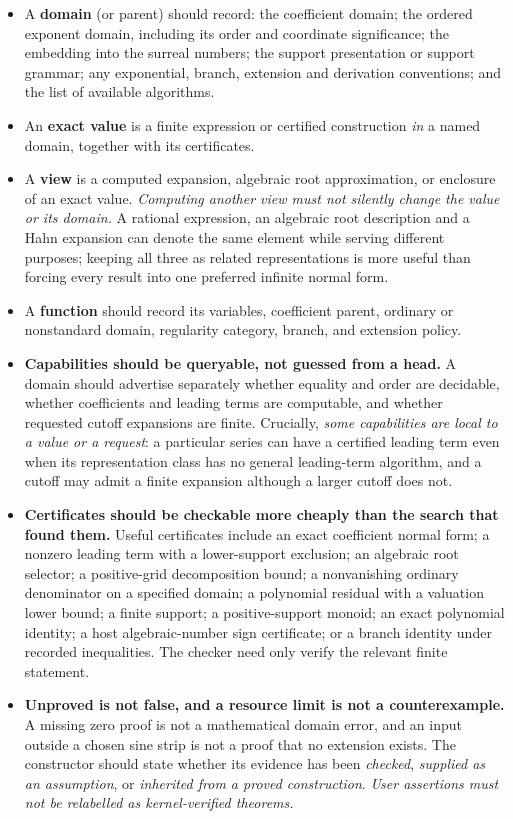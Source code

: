 \documentclass[11pt,letterpaper]{article}
\numberwithin{equation}{section}
\theoremstyle{definition}
\theoremstyle{remark}
\begin{document}
\begin{itemize}
\item A \textbf{domain} (or parent) should record: the coefficient domain; the
ordered exponent domain, including its order and coordinate significance; the
embedding into the surreal numbers; the support presentation or support
grammar; any exponential, branch, extension and derivation conventions; and the
list of available algorithms.
\item An \textbf{exact value} is a finite expression or certified construction
\emph{in} a named domain, together with its certificates.
\item A \textbf{view} is a computed expansion, algebraic root approximation, or
enclosure of an exact value. \emph{Computing another view must not silently
change the value or its domain.} A rational expression, an algebraic root
description and a Hahn expansion can denote the same element while serving
different purposes; keeping all three as related representations is more useful
than forcing every result into one preferred infinite normal form.
\item A \textbf{function} should record its variables, coefficient parent,
ordinary or nonstandard domain, regularity category, branch, and extension
policy.
\item \textbf{Capabilities should be queryable, not guessed from a head.} A
domain should advertise separately whether equality and order are decidable,
whether coefficients and leading terms are computable, and whether requested
cutoff expansions are finite. Crucially, \emph{some capabilities are local to a
value or a request}: a particular series can have a certified leading term even
when its representation class has no general leading-term algorithm, and a
cutoff may admit a finite expansion although a larger cutoff does not.
\item \textbf{Certificates should be checkable more cheaply than the search that
found them.} Useful certificates include an exact coefficient normal form; a
nonzero leading term with a lower-support exclusion; an algebraic root selector;
a positive-grid decomposition bound; a nonvanishing ordinary denominator on a
specified domain; a polynomial residual with a valuation lower bound; a finite
support; a positive-support monoid; an exact polynomial identity; a host
algebraic-number sign certificate; or a branch identity under recorded
inequalities. The checker need only verify the relevant finite statement.
\item \textbf{Unproved is not false, and a resource limit is not a
counterexample.} A missing zero proof is not a mathematical domain error, and an
input outside a chosen sine strip is not a proof that no extension exists. The
constructor should state whether its evidence has been \emph{checked},
\emph{supplied as an assumption}, or \emph{inherited from a proved
construction}. \emph{User assertions must not be relabelled as kernel-verified
theorems.}
\end{itemize}
\end{document}
